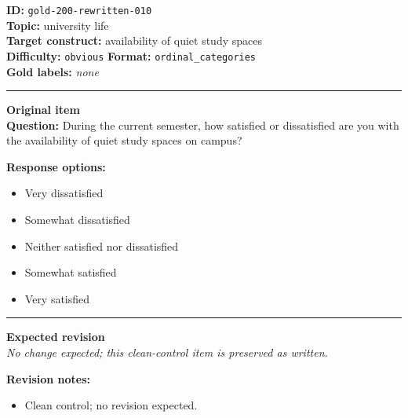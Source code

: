 \documentclass[10pt,a4paper]{article}
\newcommand{\sectionline}{\vspace{0.15em}\hrule\vspace{0.35em}}
\begin{document}
\begin{tcolorbox}[colframe=CleanGreen,colback=white,colbacktitle=CleanGreen!9,coltitle=black,title={Item 010\hfill Clean control}]
\textbf{ID:} \texttt{gold-200-rewritten-010}\\
\textbf{Topic:} university life\\
\textbf{Target construct:} availability of quiet study spaces\\
\textbf{Difficulty:} \texttt{obvious} \quad \textbf{Format:} \texttt{ordinal\_categories}\\
\textbf{Gold labels:} \textit{none}\\
\sectionline
\textbf{Original item}\\
\textbf{Question:} During the current semester, how satisfied or dissatisfied are you with the availability of quiet study spaces on campus?
\par\textbf{Response options:}
\begin{itemize}
\item Very dissatisfied
\item Somewhat dissatisfied
\item Neither satisfied nor dissatisfied
\item Somewhat satisfied
\item Very satisfied
\end{itemize}
\sectionline
\textbf{Expected revision}\\
\textit{No change expected; this clean-control item is preserved as written.}
\par\textbf{Revision notes:}
\begin{itemize}
\item Clean control; no revision expected.
\end{itemize}
\end{tcolorbox}
\end{document}
